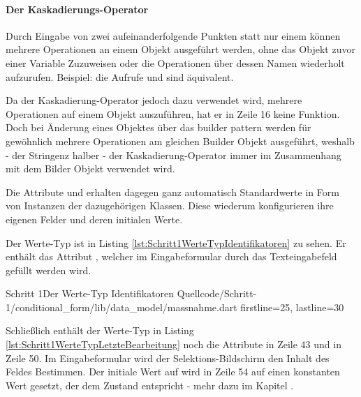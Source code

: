 \paragraph{Der Kaskadierungs-Operator}

Durch Eingabe von zwei aufeinanderfolgende Punkten  statt nur einem  können mehrere Operationen an einem Objekt ausgeführt werden, ohne  das Objekt zuvor einer Variable Zuzuweisen oder die Operationen über dessen Namen wiederholt aufzurufen. Beispiel: die Aufrufe   und  sind äquivalent. 

Da der Kaskadierung-Operator jedoch dazu verwendet wird, mehrere Operationen auf einem Objekt auszuführen, hat er in Zeile 16 keine Funktion. Doch bei Änderung eines Objektes über das builder pattern werden für gewöhnlich mehrere Operationen am gleichen Builder Objekt ausgeführt, weshalb - der Stringenz halber - der Kaskadierung-Operator immer  im Zusammenhang mit dem Bilder Objekt verwendet wird. 

Die Attribute  und   erhalten dagegen ganz automatisch Standardwerte in Form von Instanzen der dazugehörigen Klassen. Diese wiederum konfigurieren ihre eigenen Felder und deren initialen Werte.



Der Werte-Typ  ist in Listing \ref{lst:Schritt1WerteTypIdentifikatoren} zu sehen. Er enthält das Attribut , welcher im Eingabeformular durch das Texteingabefeld gefüllt werden wird.

\begin{alexlisting}{Schritt 1}{Der Werte-Typ Identifikatoren}
  {Quellcode/Schritt-1/conditional_form/lib/data_model/massnahme.dart}
  {firstline=25, lastline=30}
  \label{lst:Schritt1WerteTypIdentifikatoren}
\end{alexlisting}

Schließlich enthält der Werte-Typ  in Listing \ref{lst:Schritt1WerteTypLetzteBearbeitung} noch die Attribute  in Zeile 43 und  in Zeile 50. Im Eingabeformular wird der Selektions-Bildschirm den Inhalt des Feldes  Bestimmen. Der initiale Wert auf wird in Zeile 54 auf einen konstanten Wert gesetzt, der dem Zustand  entspricht - mehr dazu im Kapitel .

